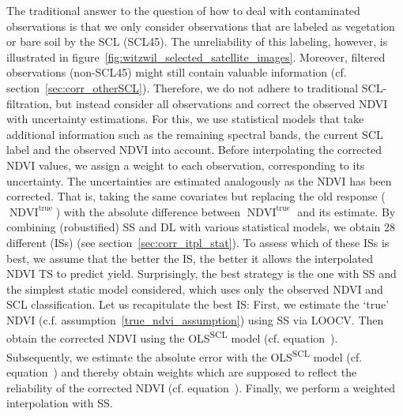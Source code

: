 The traditional answer to the question of how to deal with contaminated observations is that we only consider observations that are labeled as vegetation or bare soil by the SCL (SCL45). The unreliability of this labeling, however, is illustrated in figure~\ref{fig:witzwil_selected_satellite_images}. Moreover, filtered observations (non-SCL45) might still contain valuable information (cf. section~\ref{sec:corr_otherSCL}). Therefore, we do not adhere to traditional SCL-filtration, but instead consider all observations and correct the observed NDVI with uncertainty estimations. For this, we use statistical models that take additional information such as the remaining spectral bands, the current SCL label and the observed NDVI into account. Before interpolating the corrected NDVI values, we assign a weight to each observation, corresponding to its uncertainty. The uncertainties are estimated analogously as the NDVI has been corrected. That is, taking the same covariates but replacing the old response ($\operatorname{NDVI}^\text{true}$) with the absolute difference between $\operatorname{NDVI}^\text{true}$ and its estimate.
    By combining (robustified) SS and DL with various statistical models, we obtain 28 different ({{IS}}s) (see section~\ref{sec:corr_itpl_stat}). To assess which of these {{IS}}s is best, we assume that the better the {{IS}}, the better it allows the interpolated NDVI {TS} to predict yield. Surprisingly, the best strategy is the one with SS and the simplest static model considered, which uses only the observed NDVI and SCL classification.
Let us recapitulate the best {{IS}}: First, we estimate the `true' NDVI (c.f. assumption~\ref{true_ndvi_assumption}) using SS via LOOCV. Then obtain the corrected NDVI using the OLS\textsuperscript{SCL} model (cf. equation~). Subsequently, we estimate the absolute error with the OLS\textsuperscript{SCL} model (cf. equation~) and thereby obtain weights which are supposed to reflect the reliability of the corrected NDVI (cf. equation~). Finally, we perform a weighted interpolation with SS.


